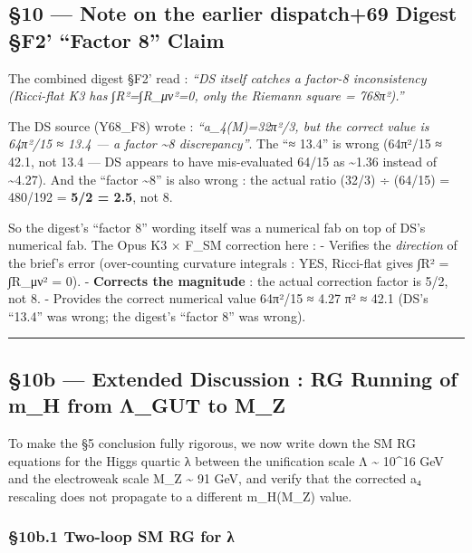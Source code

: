 \documentclass[
  11pt,
  a4paper,
]{article}
\begin{document}
\hypertarget{note-on-the-earlier dispatch69-digest-f2-factor-8-claim}{%
\subsection{§10 --- Note on the earlier dispatch+69 Digest §F2' ``Factor 8'' Claim}\label{note-on-the-earlier dispatch69-digest-f2-factor-8-claim}}

The combined digest §F2' read : \emph{``DS itself catches a factor-8 inconsistency (Ricci-flat K3 has ∫R²=∫R\_μν²=0, only the Riemann square = 768π²).''}

The DS source (Y68\_F8) wrote : \emph{``a\_4(M)=32π²/3, but the correct value is 64π²/15 ≈ 13.4 --- a factor \textasciitilde8 discrepancy''}. The ``≈ 13.4'' is wrong (64π²/15 ≈ 42.1, not 13.4 --- DS appears to have mis-evaluated 64/15 as \textasciitilde1.36 instead of \textasciitilde4.27). And the ``factor \textasciitilde8'' is also wrong : the actual ratio (32/3) ÷ (64/15) = 480/192 = \textbf{5/2 = 2.5}, not 8.

So the digest's ``factor 8'' wording itself was a numerical fab on top of DS's numerical fab. The Opus K3 × F\_SM correction here :
- Verifies the \emph{direction} of the brief's error (over-counting curvature integrals : YES, Ricci-flat gives ∫R² = ∫R\_μν² = 0).
- \textbf{Corrects the magnitude} : the actual correction factor is 5/2, not 8.
- Provides the correct numerical value 64π²/15 ≈ 4.27 π² ≈ 42.1 (DS's ``13.4'' was wrong; the digest's ``factor 8'' was wrong).


\begin{center}\rule{0.5\linewidth}{0.5pt}\end{center}

\hypertarget{b-extended-discussion-rg-running-of-m_h-from-ux3bb_gut-to-m_z}{%
\subsection{§10b --- Extended Discussion : RG Running of m\_H from Λ\_GUT to M\_Z}\label{b-extended-discussion-rg-running-of-m_h-from-ux3bb_gut-to-m_z}}

To make the §5 conclusion fully rigorous, we now write down the SM RG equations for the Higgs quartic λ between the unification scale Λ \textasciitilde{} 10\^{}16 GeV and the electroweak scale M\_Z \textasciitilde{} 91 GeV, and verify that the corrected a₄ rescaling does not propagate to a different m\_H(M\_Z) value.

\hypertarget{b.1-two-loop-sm-rg-for-ux3bb}{%
\subsubsection{§10b.1 Two-loop SM RG for λ}\label{b.1-two-loop-sm-rg-for-ux3bb}}
\end{document}
